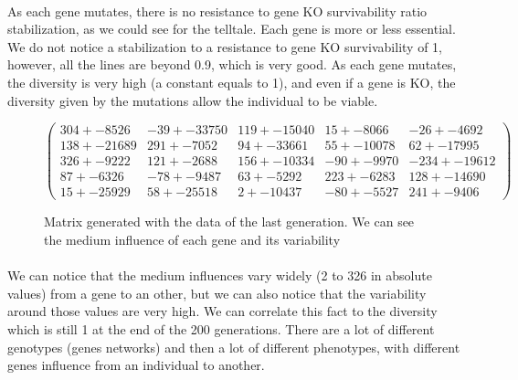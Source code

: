 \documentclass[]{report} %
\begin{document}
    \paragraph*{}
    As each gene mutates, there is no resistance to gene KO survivability ratio stabilization, as we could see for the telltale. Each gene is more or less essential. We do not notice a stabilization to a resistance to gene KO survivability of 1, however, all the lines are beyond 0.9, which is very good. As each gene mutates, the diversity is very high (a constant equals to 1), and even if a gene is KO, the diversity given by the mutations allow the individual to be viable.

    \begin{figure}[H] 
            \centering
            \small
    $
            \begin{pmatrix}
                304 +- 8526 & -39 +- 33750 & 119 +- 15040 & 15 +- 8066 & -26 +- 4692 \\
                138 +- 21689 & 291 +- 7052 & 94 +- 33661 & 55 +- 10078 & 62 +- 17995 \\
                326 +- 9222 & 121 +- 2688 & 156 +- 10334 & -90 +- 9970 & -234 +- 19612 \\
                87 +- 6326 & -78 +- 9487 & 63 +- 5292 & 223 +- 6283 & 128 +- 14690 \\
                15 +- 25929 & 58 +- 25518 & 2 +- 10437 & -80 +- 5527 & 241 +- 9406 
            \end{pmatrix}
    $
            \caption{\footnotesize Matrix generated with the data of the last generation. We can see the medium influence of each gene and its variability}
            \label{mat:ps300xg200xmr1-10-0}
    \end{figure}
    \paragraph*{}
    We can notice that the medium influences vary widely (2 to 326 in absolute values) from a gene to an other, but we can also notice that the variability around those values are very high. We can correlate this fact to the diversity which is still 1 at the end of the 200 generations. There are a lot of different genotypes (genes networks) and then a lot of different phenotypes, with different genes influence from an individual to another.
    
    
\end{document}

